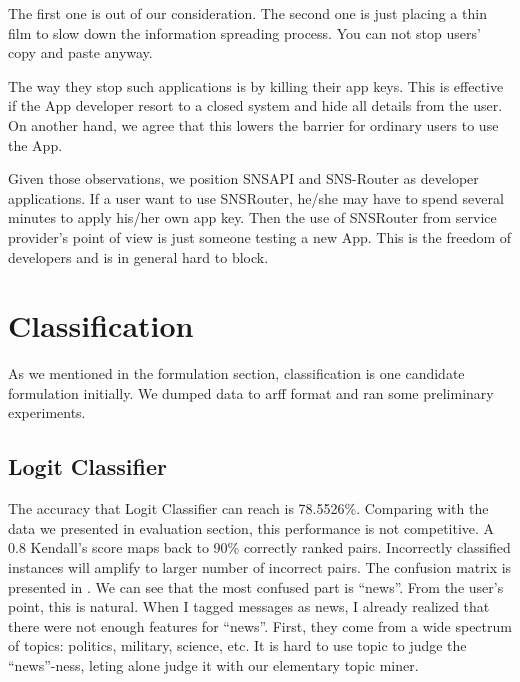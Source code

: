 \documentclass{sig-alternate}
\begin{document}
The first one is out of our consideration. 
The second one is just placing a thin film to slow down the information spreading process. 
You can not stop users' copy and paste anyway. 

The way they stop such applications is by killing their app keys. 
This is effective if the App developer resort to a closed system 
and hide all details from the user. 
On another hand, we agree that this lowers the barrier for 
ordinary users to use the App. 

Given those observations, we position SNSAPI and 
SNS-Router as developer applications. 
If a user want to use SNSRouter,
he/she may have to spend several minutes 
to apply his/her own app key. 
Then the use of SNSRouter from service provider's point of view is just 
someone testing a new App.
This is the freedom of developers and is in general hard to block. 

\section{Classification}
\label{sec:app_Classification}

As we mentioned in the formulation section, 
classification is one candidate formulation initially. 
We dumped data to arff format and ran some preliminary experiments. 

\subsection{Logit Classifier}
\label{sec:Logit Classifier}

The accuracy that Logit Classifier can reach is 78.5526\%. 
Comparing with the data we presented in evaluation section, 
this performance is not competitive. 
A 0.8 Kendall's score maps back to 90\% correctly ranked pairs. 
Incorrectly classified instances will amplify to larger number of incorrect pairs. 
The confusion matrix is presented in \rfig{\ref{fig:confmat_logit}}. 
We can see that the most confused part is ``news''. 
From the user's point, this is natural. 
When I tagged messages as news, I already realized that 
there were not enough features for ``news''. 
First, they come from a wide spectrum of topics:
politics, military, science, etc. 
It is hard to use topic to judge the ``news''-ness, 
leting alone judge it with our elementary topic miner.
\end{document}
